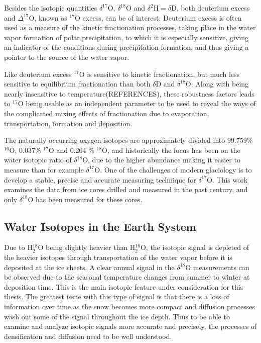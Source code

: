 \documentclass[../../CompleteThesis2/Complete_2ndDraft]{subfiles}
\begin{document}
Besides the isotopic quantities $\delta^{17}\text{O}$, $\delta^{18}\text{O}$ and $\delta^2\text{H} = \delta\text{D}$, both deuterium excess and $\Delta^{17}\text{O}$, known as $^{17}\text{O}$ excess, can be of interest. Deuterium excess is often used as a measure of the kinetic fractionation processes, taking place in the water vapor formation of polar precipitation, to which it is especially sensitive, giving an indicator of the conditions during precipitation formation, and thus giving a pointer to the source of the water vapor.

Like deuterium excess $^{17}\text{O}$ is sensitive to kinetic fractionation, but much less sensitive to equilibrium fractionation than both $\delta$D and $\delta^{18}$O. Along with being nearly insensitive to temperature(REFERENCES), these robustness factors leads to $^{17}$O being usable as an independent parameter to be used to reveal the ways of the complicated mixing effects of fractionation due to evaporation, transportation, formation and deposition.

The naturally occurring oxygen isotopes are approximately divided into 99.759\% $^{16}\text{O}$, 0.037\% $^{17}\text{O}$ and 0.204 \% $^{18}\text{O}$, and historically the focus has been on the water isotopic ratio of $\delta^{18}$O, due to the higher abundance making it easier to measure than for example $\delta^{17}$O. One of the challenges of modern glaciology is to develop a stable, precise and accurate measuring technique for $\delta^{17}$O. This work examines the data from ice cores drilled and measured in the past century, and only $\delta^{18}$O has been measured for these cores.

\subsection[Relation to Temperature]{Water Isotopes in the Earth System}
\label{Subsec:Ice_WaterIsotopes_EarthSystem}


Due to H$_2^{18}$O being slightly heavier than H$_2^{16}$O, the isotopic signal is depleted of the heavier isotopes through transportation of the water vapor before it is deposited at the ice sheets. A clear annual signal in the $\delta^{18}$O measurements can be observed due to the seasonal temperature changes from summer to winter at deposition time. This is the main isotopic feature under consideration for this thesis. The greatest issue with this type of signal is that there is a loss of information over time as the snow becomes more compact and diffusion processes wash out some of the signal throughout the ice depth. Thus to be able to examine and analyze isotopic signals more accurate and precisely, the processes of densification and diffusion need to be well understood.
\end{document}
